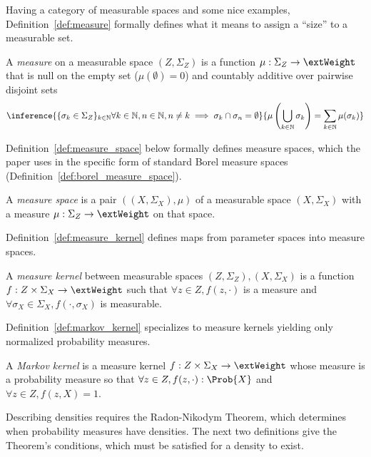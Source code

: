 Having a category of measurable spaces and some nice examples, Definition~\ref{def:measure} formally defines what it means to assign a ``size'' to a measurable set.
\begin{definition}[Measure]
\label{def:measure}
A \emph{measure} on a measurable space $(Z, \Sigma_Z)$ is a function $\mu: \Sigma_Z \rightarrow \extWeight$ that is null on the empty set ($\mu(\emptyset) = 0$) and countably additive over pairwise disjoint sets
\begin{align*}
    \inference{
        \{\sigma_k \in \Sigma_Z\}_{k\in\mathbb{N}}
        \forall k\in\mathbb{N}, n\in\mathbb{N}, n \neq k \implies \sigma_k \cap \sigma_n = \emptyset
    }{
        \mu\left( \bigcup_{k \in \mathbb{N}} \sigma_k \right) = \sum_{k\in\mathbb{N}} \mu(\sigma_k)
    }
\end{align*}
\end{definition}
Definition~\ref{def:measure_space} below formally defines measure spaces, which the paper uses in the specific form of standard Borel measure spaces (Definition~\ref{def:borel_measure_space}).
\begin{definition}
\label{def:measure_space}
A \emph{measure space} is a pair $((X, \Sigma_X), \mu)$ of a measurable space $(X, \Sigma_X)$ with a measure $\mu: \Sigma_Z \rightarrow \extWeight$ on that space.
\end{definition}
Definition~\ref{def:measure_kernel} defines maps from parameter spaces into measure spaces.
\begin{definition}
\label{def:measure_kernel}
A \emph{measure kernel} between measurable spaces $(Z, \Sigma_Z), (X, \Sigma_X)$ is a function $f: Z \times \Sigma_X \rightarrow \extWeight$ such that $\forall z\in Z, f(z, \cdot)$ is a measure and $\forall \sigma_X \in \Sigma_X, f(\cdot, \sigma_X)$ is measurable.
\end{definition}
Definition~\ref{def:markov_kernel} specializes to measure kernels yielding only normalized probability measures.
\begin{definition}
\label{def:markov_kernel}
A \emph{Markov kernel} is a measure kernel $f: Z \times \Sigma_X \rightarrow \extWeight$ whose measure is a probability measure so that $\forall z\in Z, f(z, \cdot): \Prob{X}$ and $\forall z\in Z, f(z, X) = 1$.
\end{definition}
Describing densities requires the Radon-Nikodym Theorem, which determines when probability measures have densities. The next two definitions give the Theorem's conditions, which must be satisfied for a density to exist.

